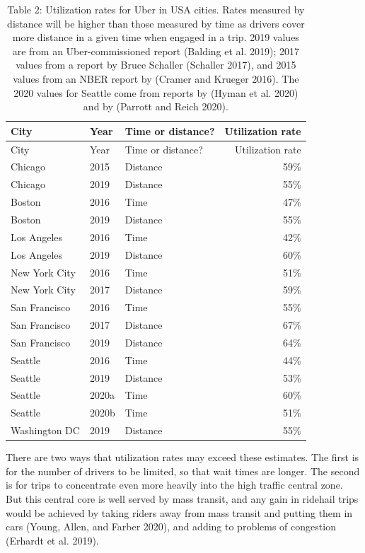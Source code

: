 \documentclass[
  letterpaper,
]{article}
\begin{document}
\begin{longtable}[]{@{}lllr@{}}
\caption{Table 2: Utilization rates for Uber in USA cities. Rates
measured by distance will be higher than those measured by time as
drivers cover more distance in a given time when engaged in a trip. 2019
values are from an Uber-commissioned report (Balding et al. 2019); 2017
values from a report by Bruce Schaller (Schaller 2017), and 2015 values
from an NBER report by (Cramer and Krueger 2016). The 2020 values for
Seattle come from reports by (Hyman et al. 2020) and by (Parrott and
Reich 2020).}\tabularnewline
\toprule()
City & Year & Time or distance? & Utilization rate \\
\midrule()
\endfirsthead
\toprule()
City & Year & Time or distance? & Utilization rate \\
\midrule()
\endhead
Chicago & 2015 & Distance & 59\% \\
Chicago & 2019 & Distance & 55\% \\
Boston & 2016 & Time & 47\% \\
Boston & 2019 & Distance & 55\% \\
Los Angeles & 2016 & Time & 42\% \\
Los Angeles & 2019 & Distance & 60\% \\
New York City & 2016 & Time & 51\% \\
New York City & 2017 & Distance & 59\% \\
San Francisco & 2016 & Time & 55\% \\
San Francisco & 2017 & Distance & 67\% \\
San Francisco & 2019 & Distance & 64\% \\
Seattle & 2016 & Time & 44\% \\
Seattle & 2019 & Distance & 53\% \\
Seattle & 2020a & Time & 60\% \\
Seattle & 2020b & Time & 51\% \\
Washington DC & 2019 & Distance & 55\% \\
\bottomrule()
\end{longtable}

There are two ways that utilization rates may exceed these estimates.
The first is for the number of drivers to be limited, so that wait times
are longer. The second is for trips to concentrate even more heavily
into the high traffic central zone. But this central core is well served
by mass transit, and any gain in ridehail trips would be achieved by
taking riders away from mass transit and putting them in cars (Young,
Allen, and Farber 2020), and adding to problems of congestion (Erhardt
et al. 2019).
\end{document}
